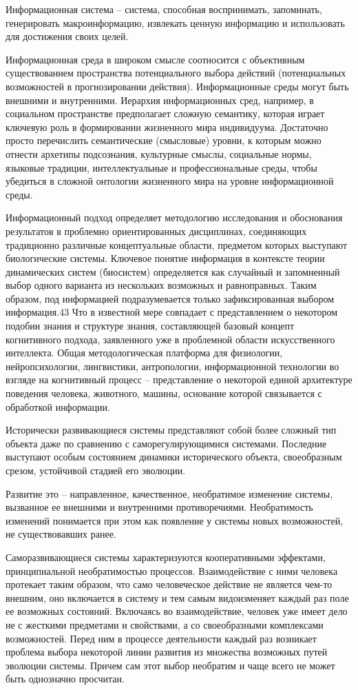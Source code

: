 \documentclass[exam_answers.tex]{subfiles}
\begin{document}
Информационная система – система, способная воспринимать,
запоминать, генерировать макроинформацию, извлекать ценную информацию и
использовать для достижения своих целей.

Информационная среда в широком смысле соотносится с объективным
существованием пространства потенциального выбора действий
(потенциальных возможностей в прогнозировании действия). Информационные
среды могут быть внешними и внутренними. Иерархия информационных сред,
например, в социальном пространстве предполагает сложную семантику,
которая играет ключевую роль в формировании жизненного мира индивидуума.
Достаточно просто перечислить семантические (смысловые) уровни, к которым
можно отнести архетипы подсознания, культурные смыслы, социальные
нормы, языковые традиции, интеллектуальные и профессиональные среды,
чтобы убедиться в сложной онтологии жизненного мира на уровне
информационной среды.

Информационный подход определяет методологию исследования и
обоснования результатов в проблемно ориентированных дисциплинах,
соединяющих традиционно различные концептуальные области, предметом
которых выступают биологические системы. Ключевое понятие информация в
контексте теории динамических систем (биосистем) определяется как
случайный и запомненный выбор одного варианта из нескольких возможных и
равноправных. Таким образом, под информацией подразумевается только
зафиксированная выбором информация.43 Что в известной мере совпадает с
представлением о некотором подобии знания и структуре знания,
составляющей базовый концепт когнитивного подхода, заявленного уже в
проблемной области искусственного интеллекта. Общая методологическая
платформа для физиологии, нейропсихологии, лингвистики, антропологии,
информационной технологии во взгляде на когнитивный процесс –
представление о некоторой единой архитектуре поведения человека,
животного, машины, основание которой связывается с обработкой
информации.

Исторически развивающиеся системы представляют собой более
сложный тип объекта даже по сравнению с саморегулирующимися
системами. Последние выступают особым состоянием динамики
исторического объекта, своеобразным срезом, устойчивой стадией его
эволюции.

Развитие это – направленное, качественное, необратимое изменение
системы, вызванное ее внешними и внутренними противоречиями.
Необратимость изменений понимается при этом как появление у системы
новых возможностей, не существовавших ранее.

Саморазвивающиеся системы характеризуются кооперативными
эффектами, принципиальной необратимостью процессов. Взаимодействие с
ними человека протекает таким образом, что само человеческое
действие не является чем-то внешним, оно включается в систему и тем
самым видоизменяет каждый раз поле ее возможных состояний.
Включаясь во взаимодействие, человек уже имеет дело не с жесткими
предметами и свойствами, а со своеобразными комплексами
возможностей. Перед ним в процессе деятельности каждый раз возникает
проблема выбора некоторой линии развития из множества возможных
путей эволюции системы. Причем сам этот выбор необратим и чаще всего не
может быть однозначно просчитан.
\end{document}
